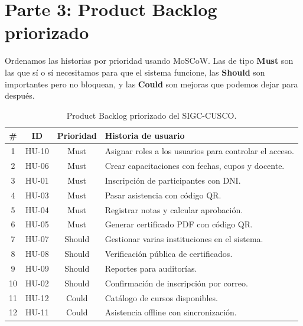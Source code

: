 \section{Parte 3: Product Backlog priorizado}

Ordenamos las historias por prioridad usando MoSCoW. Las de tipo \textbf{Must} son las que sí o sí necesitamos para que el sistema funcione, las \textbf{Should} son importantes pero no bloquean, y las \textbf{Could} son mejoras que podemos dejar para después.

\begin{table}[htbp]
\centering
\small
\renewcommand{\arraystretch}{1.15}
\begin{tabularx}{\textwidth}{c c c X}
\toprule
\textbf{\#} & \textbf{ID} & \textbf{Prioridad} & \textbf{Historia de usuario} \\
\midrule
1 & HU-10 & Must & Asignar roles a los usuarios para controlar el acceso. \\
\midrule
2 & HU-06 & Must & Crear capacitaciones con fechas, cupos y docente. \\
\midrule
3 & HU-01 & Must & Inscripción de participantes con DNI. \\
\midrule
4 & HU-03 & Must & Pasar asistencia con código QR. \\
\midrule
5 & HU-04 & Must & Registrar notas y calcular aprobación. \\
\midrule
6 & HU-05 & Must & Generar certificado PDF con código QR. \\
\midrule
7 & HU-07 & Should & Gestionar varias instituciones en el sistema. \\
\midrule
8 & HU-08 & Should & Verificación pública de certificados. \\
\midrule
9 & HU-09 & Should & Reportes para auditorías. \\
\midrule
10 & HU-02 & Should & Confirmación de inscripción por correo. \\
\midrule
11 & HU-12 & Could & Catálogo de cursos disponibles. \\
\midrule
12 & HU-11 & Could & Asistencia offline con sincronización. \\
\bottomrule
\end{tabularx}
\caption{Product Backlog priorizado del SIGC-CUSCO.}
\label{tab:backlog}
\end{table}
